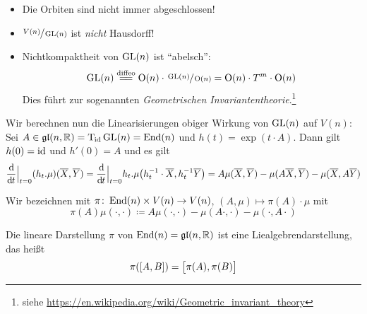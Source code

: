 \begin{bemerkung*}[{name=[topologische Eigenschaften von $V(n)$]}]
	\begin{itemize}
		\item Die Orbiten sind nicht immer abgeschlossen!
		\item $\sfrac{V(n)}{\operatorname{GL}(n)}$ ist \emph{nicht} Hausdorff!
		\item Nichtkompaktheit von $\operatorname{GL}(n)$ ist \enquote{abelsch}:
		\[
			\GL(n) \StackText{diffeo}{=\joinrel=}\On(n) \cdot \sfrac{\GL(n)}{\On(n)} = \On(n) \cdot T^m \cdot \On(n)
		\]
		Dies führt zur sogenannten \emph{Geometrischen Invariantentheorie}.\footnote{siehe \url{https://en.wikipedia.org/wiki/Geometric_invariant_theory}}
	\end{itemize}
\end{bemerkung*}

Wir berechnen nun die Linearisierungen obiger Wirkung von $\operatorname{GL}(n)$ auf $V(n)$:
Sei $A \in \mathfrak{gl}(n,\mathbb{R}) = \mathrm{T}\mkern-0.85mu_{\operatorname{id}} \operatorname{GL}(n) = \operatorname{End}(n)$ und $h(t)=\exp(t \cdot A)$.
Dann gilt $h(0)= {\operatorname{id}}$ und $h'(0) =A$ und es gilt
\[
	\diffd{}{t}\Big|_{t=0} (h_t.\mu)(\overline{X},\overline{Y}) = \diffd{}{t}\Big|_{t=0} h_t.\mu \enbrace*{h_t^{-1} \cdot \overline{X}, h_t^{-1} \overline{Y}}
	= A \mu(\overline{X},\overline{Y}) - \mu(A \overline{X}, \overline{Y}) - \mu(\overline{X}, A \overline{Y})
\]

\begin{definition}[{name=[Wirkung von $\End(n)$ auf $V(n)$]}]
	Wir bezeichnen mit $\pi \colon \operatorname{End}(n) \times V(n) \to V(n)$, $(A,\mu) \mapsto \pi(A)\cdot \mu$ mit 
	\[
		\pi(A)\mu(\cdot ,\cdot ) \coloneqq A \mu(\cdot ,\cdot ) - \mu (A \cdot ,\cdot ) - \mu(\cdot ,A \cdot )
	\]
\end{definition}

Die lineare Darstellung $\pi$ von $\operatorname{End}(n) = \mathfrak{gl}(n,\mathbb{R})$ ist eine Liealgebrendarstellung, das heißt
\[
	\pi \enbrace*{\benbrace*{A,B}} = \benbrace[\big]{\pi(A), \pi(B)}
\]

